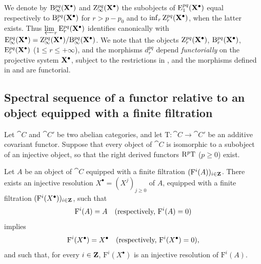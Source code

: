 \begin{env}[13.5.7]
\label{0.13.5.7}
We denote by
$\mathrm{B}_\infty^{pq}(\mathbf{X}^\bullet)$ and
$\mathrm{Z}_\infty^{pq}(\mathbf{X}^\bullet)$ the subobjects of
$\mathrm{E}_1^{pq}(\mathbf{X}^\bullet)$ equal respectively to
$\mathrm{B}_r^{pq}(\mathbf{X}^\bullet)$ for $r>p-p_0$ and to
$\inf_r\mathrm{Z}_r^{pq}(\mathbf{X}^\bullet)$, when the latter exists.
Thus $\varprojlim_r\mathrm{E}_r^{pq}(\mathbf{X}^\bullet)$
identifies canonically with $\mathrm{E}_\infty^{pq}(\mathbf{X}^\bullet)
=
\mathrm{Z}_\infty^{pq}(\mathbf{X}^\bullet)/
\mathrm{B}_\infty^{pq}(\mathbf{X}^\bullet)$.
We note that the objects
$\mathrm{Z}_r^{pq}(\mathbf{X}^\bullet)$,
$\mathrm{B}_r^{pq}(\mathbf{X}^\bullet)$,
$\mathrm{E}_r^{pq}(\mathbf{X}^\bullet)$
($1\leq r\leq+\infty$), and the morphisms $d_r^{pq}$ depend
\emph{functorially} on the projective system $\mathbf{X}^\bullet$, subject
to the restrictions in , and the morphisms defined in
 and  are functorial.
\end{env}

\subsection{Spectral sequence of a functor relative to an object equipped with a finite filtration}
\label{subsection:0.13.6}

\begin{env}[13.6.1]
\label{0.13.6.1}
Let $\cat{C}$ and $\cat{C}'$ be two abelian categories, and let
$\mathrm{T}:\cat{C}\longrightarrow\cat{C}'$ be an additive covariant
functor.
Suppose that every object of $\cat{C}$ is isomorphic to a subobject of
an injective object, so that the right derived functors
$\mathrm{R}^p\mathrm{T}$ ($p\geq0$) exist.
\end{env}

\begin{lemma}[13.6.2]
\label{0.13.6.2}
Let $A$ be an object of $\cat{C}$ equipped with a \textup{finite} filtration
$(\mathrm{F}^i(A))_{i\in\mathbf{Z}}$.
There exists an injective resolution
$X^\bullet=(X^j)_{j\geq0}$ of $A$, equipped with a finite filtration
$(\mathrm{F}^i(X^\bullet))_{i\in\mathbf{Z}}$, such that
\[
  \mathrm{F}^i(A)=A
  \quad\text{\textup{(respectively, }}\mathrm{F}^i(A)=0\text{\textup{)}}
\]
implies
\[
  \mathrm{F}^i(X^\bullet)=X^\bullet
  \quad\text{\textup{(respectively, }}\mathrm{F}^i(X^\bullet)=0\text{\textup{)}},
\]
and such that, for every $i\in\mathbf{Z}$,
$\mathrm{F}^i(X^\bullet)$ is an injective resolution of
$\mathrm{F}^i(A)$.
\end{lemma}

